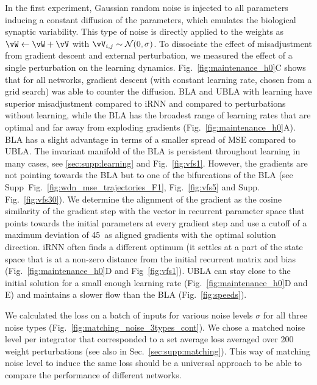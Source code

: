 \documentclass{article} %
\newcounter{ct}
\theoremstyle{definition}
\theoremstyle{remark}
\begin{document}
In the first experiment, Gaussian random noise is injected to all parameters inducing a constant diffusion of the parameters, which emulates the biological synaptic variability.
This type of noise is directly applied to the weights as $ \vW \leftarrow \vW + \vV$ with $\vV_{i,j}\sim\mathcal{N}(0,\sigma)$. To dissociate the effect of misadjustment from gradient descent and external perturbation, we measured the effect of a single perturbation on the learning dynamics.
Fig.~\ref{fig:maintenance_h0}C shows that for all networks, gradient descent (with constant learning rate, chosen from a grid search) was able to counter the diffusion.
BLA and UBLA with learning have superior misadjustment compared to iRNN and compared to perturbations without learning, while the BLA has the broadest range of learning rates that are optimal and far away from exploding gradients (Fig.~\ref{fig:maintenance_h0}A).
BLA has a slight advantage in terms of a smaller spread of MSE compared to UBLA.
The invariant manifold of the BLA is persistent throughout learning in many cases, see \ref{sec:supp:learning} and Fig.~\ref{fig:vfs1}. However, the gradients are not pointing towards the BLA but to one of the bifurcations of the BLA (see Supp~Fig.~\ref{fig:wdn_mse_trajectories_F1}, Fig.~\ref{fig:vfs5} and Supp. Fig.~\ref{fig:vfs30}). We determine the alignment of the gradient as the cosine similarity of the gradient step with the vector in recurrent parameter space that points towards the initial parameters at every gradient step and use a cutoff of a maximum deviation of 45\textdegree\  as aligned gradients with the optimal solution direction.
iRNN often finds a different optimum (it settles at a part of the state space that is at a non-zero distance from the initial recurrent matrix and bias (Fig.~\ref{fig:maintenance_h0}D and Fig~\ref{fig:vfs1}).
UBLA can stay close to the initial solution for a small enough learning rate (Fig.~\ref{fig:maintenance_h0}D and E) and maintains a slower flow than the BLA (Fig.~\ref{fig:speeds}).


We calculated the loss on a batch of inputs for various noise levels $\sigma$ for all three noise types (Fig.~\ref{fig:matching_noise_3types_cont}).
We chose a matched noise level per integrator that corresponded to a set average loss averaged over 200 weight perturbations (see also in Sec.~\ref{sec:supp:matching}).
This way of matching noise level to induce the same loss should be a universal approach to be able to compare the performance of different networks.
\end{document}
